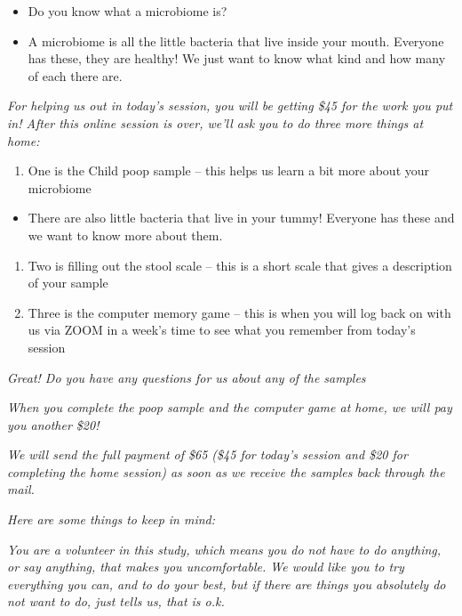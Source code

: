 \documentclass[]{book}
\providecommand{\tightlist}{%
  \setlength{\itemsep}{0pt}\setlength{\parskip}{0pt}}
\begin{document}
\begin{itemize}
\tightlist
\item
  Do you know what a microbiome is?
\item
  A microbiome is all the little bacteria that live inside your mouth. Everyone has these, they are healthy! We just want to know what kind and how many of each there are.
\end{itemize}

\emph{For helping us out in today's session, you will be getting \$45 for the work you put in! After this online session is over, we'll ask you to do three more things at home:}

\begin{enumerate}
\def\labelenumi{\arabic{enumi}.}
\tightlist
\item
  One is the Child poop sample -- this helps us learn a bit more about your microbiome
\end{enumerate}

\begin{itemize}
\tightlist
\item
  There are also little bacteria that live in your tummy! Everyone has these and we want to know more about them.
\end{itemize}

\begin{enumerate}
\def\labelenumi{\arabic{enumi}.}
\setcounter{enumi}{1}
\tightlist
\item
  Two is filling out the stool scale -- this is a short scale that gives a description of your sample
\item
  Three is the computer memory game -- this is when you will log back on with us via ZOOM in a week's time to see what you remember from today's session
\end{enumerate}

\emph{Great! Do you have any questions for us about any of the samples}

\emph{When you complete the poop sample and the computer game at home, we will pay you another \$20!}

\emph{We will send the full payment of \$65 (\$45 for today's session and \$20 for completing the home session) as soon as we receive the samples back through the mail.}

\emph{Here are some things to keep in mind:}

\emph{You are a volunteer in this study, which means you do not have to do anything, or say anything, that makes you uncomfortable. We would like you to try everything you can, and to do your best, but if there are things you absolutely do not want to do, just tells us, that is o.k.}
\end{document}
